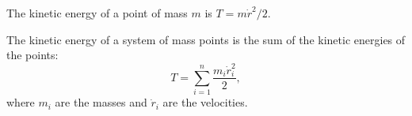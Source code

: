 The kinetic energy of a point of mass $m$ is $T = m\dot{r}^2/2$.

The kinetic energy of a system of mass points is the sum of the kinetic energies of the points:
$$T = \sum_{i=1}^{n} \frac{m_i \dot{r}_i^2}{2},$$
where $m_i$ are the masses and $\dot{r}_i$ are the velocities.
